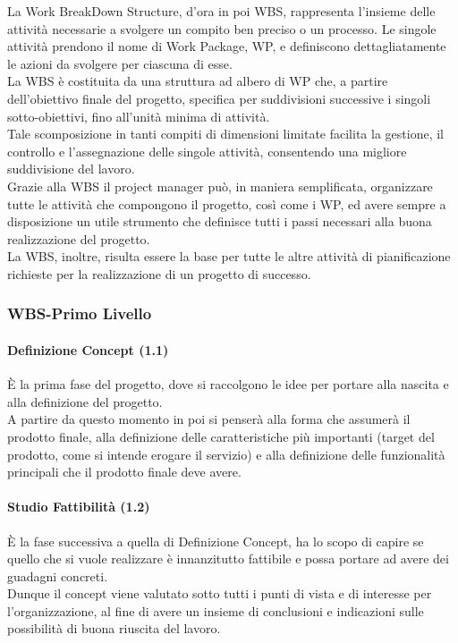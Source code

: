 La Work BreakDown Structure, d'ora in poi WBS, rappresenta l'insieme delle attività necessarie a svolgere un compito ben preciso o un processo. Le singole attività prendono il nome di Work Package, WP, e definiscono dettagliatamente le azioni da svolgere per
ciascuna di esse.\\
La WBS è costituita da una struttura ad albero di WP che, a partire dell'obiettivo finale del progetto, specifica per suddivisioni successive i singoli sotto-obiettivi, fino all'unità minima di attività.\\
Tale scomposizione in tanti compiti di dimensioni limitate facilita la gestione, il controllo e l'assegnazione delle singole attività, consentendo una migliore suddivisione del lavoro.\\
Grazie alla WBS il project manager può, in maniera semplificata, organizzare tutte le attività che compongono il progetto, così come i WP, ed avere sempre a disposizione un utile strumento che definisce tutti i passi necessari alla buona realizzazione del progetto.\\
La WBS, inoltre, risulta essere la base per tutte le altre attività di pianificazione richieste per la realizzazione di un progetto di successo.

\subsubsection{WBS-Primo Livello}
\paragraph{Definizione Concept (1.1)}
È la prima fase del progetto, dove si raccolgono le idee per portare alla nascita e alla definizione del progetto.\\
A partire da questo momento in poi si penserà alla forma che assumerà il prodotto finale, alla  definizione delle caratteristiche più importanti (target del prodotto, come si intende erogare il servizio) e alla definizione delle funzionalità principali che il prodotto finale deve avere.

\paragraph{Studio Fattibilità (1.2)}
È la fase successiva a quella di Definizione Concept, ha lo scopo di capire se quello che si vuole realizzare è innanzitutto fattibile e possa portare ad avere dei guadagni concreti.\\
Dunque il concept viene valutato sotto tutti i punti di vista e di interesse per l'organizzazione, al fine di avere un insieme di conclusioni e indicazioni sulle possibilità di buona riuscita del lavoro.


